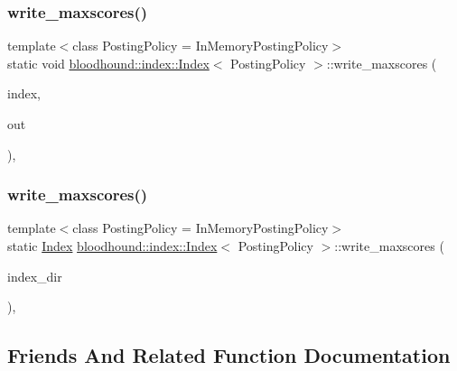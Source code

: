 \subsubsection{\texorpdfstring{write\+\_\+maxscores()}{write\_maxscores()}\hspace{0.1cm}{\footnotesize\ttfamily [1/2]}}
{\footnotesize\ttfamily template$<$class Posting\+Policy = In\+Memory\+Posting\+Policy$>$ \\
static void \hyperlink{classbloodhound_1_1index_1_1Index}{bloodhound\+::index\+::\+Index}$<$ Posting\+Policy $>$\+::write\+\_\+maxscores (\begin{DoxyParamCaption}\item[{\hyperlink{classbloodhound_1_1index_1_1Index}{Index}$<$ Posting\+Policy $>$ \&}]{index,  }\item[{fs\+::path}]{out }\end{DoxyParamCaption})\hspace{0.3cm}{\ttfamily [inline]}, {\ttfamily [static]}}

\mbox{\label{classbloodhound_1_1index_1_1Index_a46fcfc3c54ecf18d4ff58a240557b567}} 
\subsubsection{\texorpdfstring{write\+\_\+maxscores()}{write\_maxscores()}\hspace{0.1cm}{\footnotesize\ttfamily [2/2]}}
{\footnotesize\ttfamily template$<$class Posting\+Policy = In\+Memory\+Posting\+Policy$>$ \\
static \hyperlink{classbloodhound_1_1index_1_1Index}{Index} \hyperlink{classbloodhound_1_1index_1_1Index}{bloodhound\+::index\+::\+Index}$<$ Posting\+Policy $>$\+::write\+\_\+maxscores (\begin{DoxyParamCaption}\item[{fs\+::path}]{index\+\_\+dir }\end{DoxyParamCaption})\hspace{0.3cm}{\ttfamily [inline]}, {\ttfamily [static]}}



\subsection{Friends And Related Function Documentation}
\mbox{\label{classbloodhound_1_1index_1_1Index_a0343a97c005a2df437a955c308d376e6}} 

